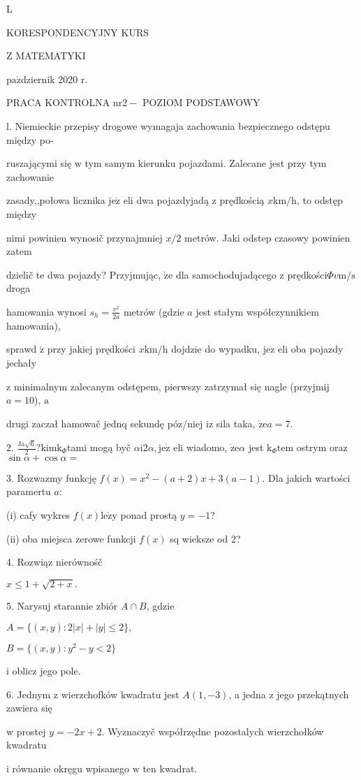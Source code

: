 \documentclass[a4paper,12pt]{article}
\begin{document}
L

KORESPONDENCYJNY KURS

Z MATEMATYKI

$\mathrm{p}\mathrm{a}\acute{\mathrm{z}}$dziernik 2020 $\mathrm{r}.$

PRACA KONTROLNA $\mathrm{n}\mathrm{r} 2-$ POZIOM PODSTAWOWY

l. Niemieckie przepisy drogowe wymagaja zachowania bezpiecznego odstępu między po-

ruszającymi się $\mathrm{w}$ tym samym kierunku pojazdami. Zalecane jest przy tym zachowanie

zasady,,połowa licznika $\mathrm{j}\mathrm{e}\dot{\mathrm{z}}$ eli dwa pojazdyjadą $\mathrm{z}$ prędkością $x\mathrm{k}\mathrm{m}/\mathrm{h}$, to odstęp między

nimi powinien wynosič przynajmniej $x/2$ metrów. Jaki odstep czasowy powinien zatem

dzielič te dwa pojazdy? Przyjmując, $\dot{\mathrm{z}}\mathrm{e}$ dla samochodujadącego $\mathrm{z}$ prędkości$\Phi v\mathrm{m}/\mathrm{s}$ droga

hamowania wynosi $s_{h}=\displaystyle \frac{v^{2}}{2a}$ metrów (gdzie $a$ jest stałym współczynnikiem hamowania),

sprawd $\acute{\mathrm{z}}$ przy jakiej prędkości $x\mathrm{k}\mathrm{m}/\mathrm{h}$ dojdzie do wypadku, $\mathrm{j}\mathrm{e}\dot{\mathrm{z}}$ eli oba pojazdy jechały

$\mathrm{z}$ minimalnym zalecanym odstępem, pierwszy zatrzymał się nagle (przyjmij $a=10$), $\mathrm{a}$

drugi zaczał hamowač jednq sekundę póz/niej $\mathrm{i}\mathrm{z}$ sila taka, $\dot{\mathrm{z}}\mathrm{e}a=7.$

2. $\displaystyle \frac{\mathrm{J}\mathrm{a}\sqrt{6}}{2}?\mathrm{k}\mathrm{i}\mathrm{m}\mathrm{k}_{\Phi}$tami mogą byč $\alpha \mathrm{i}2\alpha, \mathrm{j}\mathrm{e}\dot{\mathrm{z}}$ eli wiadomo, $\dot{\mathrm{z}}\mathrm{e}\alpha$ jest $\mathrm{k}_{\Phi}\mathrm{t}\mathrm{e}\mathrm{m}$ ostrym oraz $\sin\alpha+\cos\alpha=$

$3$. Rozwazmy funkcję $f(x)=x^{2}-(a+2)x+3(a-1)$. Dla jakich wartości paramertu $a$:

(i) cafy wykres $f(x)\mathrm{l}\mathrm{e}\dot{\mathrm{z}}\mathrm{y}$ ponad prostą $y=-1$?

(ii) oba miejsca zerowe funkcji $f(x)$ sq wieksze od 2?

4. Rozwiąz nierównośč

$x\leq 1+\sqrt{2+x}.$

5. Narysuj starannie zbiór $A\cap B$, gdzie

$A=\{(x,y):2|x|+|y|\leq 2\},$

$B=\{(x,y):y^{2}-y<2\}$

$\mathrm{i}$ oblicz jego pole.

6. Jednym $\mathrm{z}$ wierzchofków kwadratu jest $A(1,-3)$, a jedna $\mathrm{z}$ jego przekątnych zawiera się

$\mathrm{w}$ prostej $y = -2x+2$. Wyznaczyč współrzędne pozostalych wierzchołków kwadratu

$\mathrm{i}$ równanie okręgu wpisanego $\mathrm{w}$ ten kwadrat.
\end{document}

